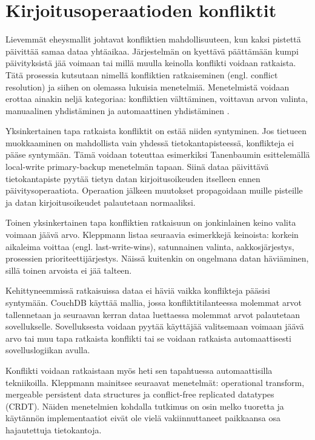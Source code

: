 \documentclass[finnish,twoside,censored,csm,sw-track-2018]{HYthesisML}
\begin{document}
\section{Kirjoitusoperaatioden konfliktit}

Lievemmät eheysmallit johtavat konfliktien mahdollisuuteen, kun kaksi pistettä päivittää samaa dataa yhtäaikaa. Järjestelmän on kyettävä päättämään kumpi päivityksistä jää voimaan tai millä muulla keinolla konflikti voidaan ratkaista. Tätä prosessia kutsutaan nimellä konfliktien ratkaiseminen (engl. conflict resolution) ja siihen on olemassa lukuisia menetelmiä. Menetelmistä voidaan erottaa ainakin neljä kategoriaa: konfliktien välttäminen, voittavan arvon valinta, manuaalinen yhdistäminen ja automaattinen yhdistäminen \citep{Kleppmann}.

Yksinkertainen tapa ratkaista konfliktit on estää niiden syntyminen. Jos tietueen muokkaaminen on mahdollista vain yhdessä tietokantapisteessä, konflikteja ei pääse syntymään. Tämä voidaan toteuttaa esimerkiksi Tanenbaumin \citep{Tanenbaum} esittelemällä local-write primary-backup menetelmän tapaan. Siinä dataa päivittävä tietokantapiste pyytää tietyn datan kirjoitusoikeuden itselleen ennen päivitysoperaatiota. Operaation jälkeen muutokset propagoidaan muille pisteille ja datan kirjoitusoikeudet palautetaan normaaliksi.

Toinen yksinkertainen tapa konfliktien ratkaisuun on jonkinlainen keino valita voimaan jäävä arvo. Kleppmann \cite{Kleppmann} listaa seuraavia esimerkkejä keinoista: korkein aikaleima voittaa (engl. last-write-wins), satunnainen valinta, aakkosjärjestys, prosessien prioriteettijärjestys. Näissä kuitenkin on ongelmana datan häviäminen, sillä toinen arvoista ei jää talteen.

Kehittyneemmissä ratkaisuissa dataa ei häviä vaikka konflikteja pääsisi syntymään. CouchDB \citep{couchdb} käyttää mallia, jossa konfliktitilanteessa molemmat arvot tallennetaan ja seuraavan kerran dataa luettaessa molemmat arvot palautetaan sovellukselle. Sovelluksesta voidaan pyytää käyttäjää valitsemaan voimaan jäävä arvo tai muu tapa ratkaista konflikti tai se voidaan ratkaista automaattisesti sovelluslogiikan avulla.

Konflikti voidaan ratkaistaan myös heti sen tapahtuessa automaattisilla tekniikoilla. Kleppmann \citep{Kleppmann} mainitsee seuraavat menetelmät: operational transform, mergeable persistent data structures ja conflict-free replicated datatypes (CRDT). Näiden menetelmien kohdalla tutkimus on osin melko tuoretta ja käytännön implementaatiot eivät ole vielä vakiinnuttaneet paikkaansa osa hajautettuja tietokantoja.
\end{document}
